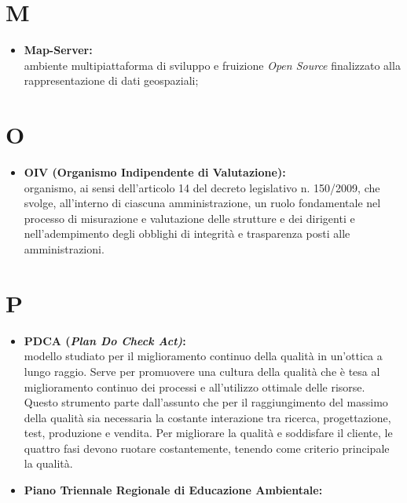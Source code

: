 \documentclass[11pt]{book}              %
\begin{document}
\section*{M}
\begin{itemize}
	\item \textbf{{\color{Plum} Map-Server}:} \\
	ambiente multipiattaforma di sviluppo e fruizione \textit{Open Source} finalizzato alla rappresentazione di dati geospaziali;
\end{itemize}

\section*{O}

\begin{itemize}

	\item \textbf{{\color{OliveGreen}OIV} (Organismo Indipendente di Valutazione):} \\	organismo, ai sensi dell'articolo 14 del decreto legislativo n. 150/2009, che svolge, all'interno di ciascuna amministrazione, un ruolo fondamentale nel processo di misurazione e valutazione delle strutture e dei dirigenti e nell'adempimento degli obblighi di integrità e trasparenza posti alle amministrazioni.
	
\end{itemize}

\section*{P}

\begin{itemize}
\item \textbf{{\color{OliveGreen}PDCA} (\textit{Plan Do Check Act)}:} \\
modello studiato per il miglioramento continuo della qualità in un'ottica a lungo raggio. Serve per promuovere una cultura della qualità che è tesa al miglioramento continuo dei processi e all'utilizzo ottimale delle risorse. Questo strumento parte dall'assunto che per il raggiungimento del massimo della qualità sia necessaria la costante interazione tra ricerca, progettazione, test, produzione e vendita. Per migliorare la qualità e soddisfare il cliente, le quattro fasi devono ruotare costantemente, tenendo come criterio principale la qualità.

\item \textbf{{\color{Plum}Piano Triennale Regionale di Educazione Ambientale}:} \\
\end{itemize}
\end{document}
